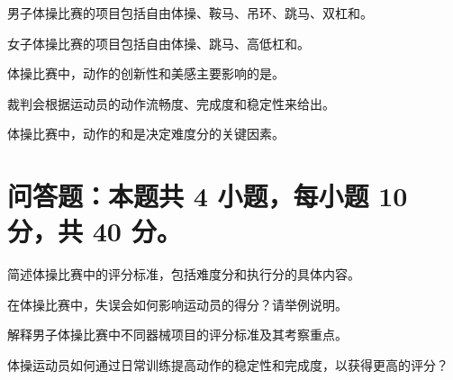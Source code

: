 \documentclass{exam-zh}
\begin{document}
    \begin{question}
    男子体操比赛的项目包括自由体操、鞍马、吊环、跳马、双杠和\fillin[单杠]。
    \end{question}
    
    \begin{question}
    女子体操比赛的项目包括自由体操、跳马、高低杠和\fillin[平衡木]。
    \end{question}
    
    \begin{question}
    体操比赛中，动作的创新性和美感主要影响的是\fillin[表现分]。
    \end{question}
    

    \begin{question}
    裁判会根据运动员的动作流畅度、完成度和稳定性来给出\fillin[执行分]。
    \end{question}
    
    \begin{question}
    体操比赛中，动作的\fillin[复杂性]和\fillin[完成度]是决定难度分的关键因素。
    \end{question}

\section{问答题：本题共 4 小题，每小题 10 分，共 40 分。}

\begin{problem}[points = 10] 简述体操比赛中的评分标准，包括难度分和执行分的具体内容。\end{problem}

\begin{problem}[points = 10] 在体操比赛中，失误会如何影响运动员的得分？请举例说明。\end{problem}

\begin{problem}[points = 10] 解释男子体操比赛中不同器械项目的评分标准及其考察重点。\end{problem}

\begin{problem}[points = 10] 体操运动员如何通过日常训练提高动作的稳定性和完成度，以获得更高的评分？\end{problem}
\end{document}
